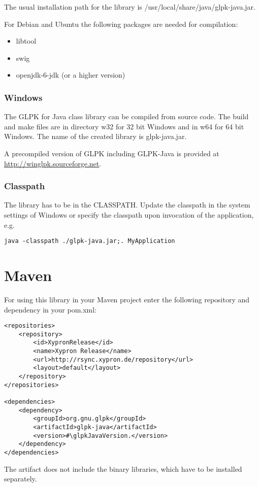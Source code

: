 \documentclass[a4paper,11pt]{report}
\newcommand{\glpkJavaVersion}{1.0.37}
\begin{document}
The usual installation path for the library is /usr/local/share/java/glpk-java.jar.

For Debian and Ubuntu the following packages are needed for compilation:
\begin{itemize}
	\item libtool
	\item swig
	\item openjdk-6-jdk (or a higher version)
\end{itemize}
\subsection{Windows}
The GLPK for Java class library can be compiled from source code. The build and make files are in directory w32 for 32 bit Windows and in w64 for 64 bit Windows. The name of the created library is glpk-java.jar.

A precompiled version of GLPK including GLPK-Java is provided at \linebreak\href{http://winglpk.sourceforge.net}{http://winglpk.sourceforge.net}.

\subsection{Classpath}
The library has to be in the CLASSPATH. Update the classpath in the system settings of Windows or specify the classpath upon invocation of the application, e.g.
\begin{verbatim}
java -classpath ./glpk-java.jar;. MyApplication
\end{verbatim}
\chapter{Maven}
For using this library in your Maven project enter the following repository and dependency in your pom.xml:
\begin{lstlisting}
<repositories>
    <repository>
        <id>XypronRelease</id>
        <name>Xypron Release</name>
        <url>http://rsync.xypron.de/repository</url>
        <layout>default</layout>
    </repository>
</repositories>

<dependencies>
    <dependency>
        <groupId>org.gnu.glpk</groupId>
        <artifactId>glpk-java</artifactId>
        <version>#\glpkJavaVersion.</version>
    </dependency>
</dependencies>
\end{lstlisting}
The artifact does not include the binary libraries, which have to be installed separately.
\end{document}

